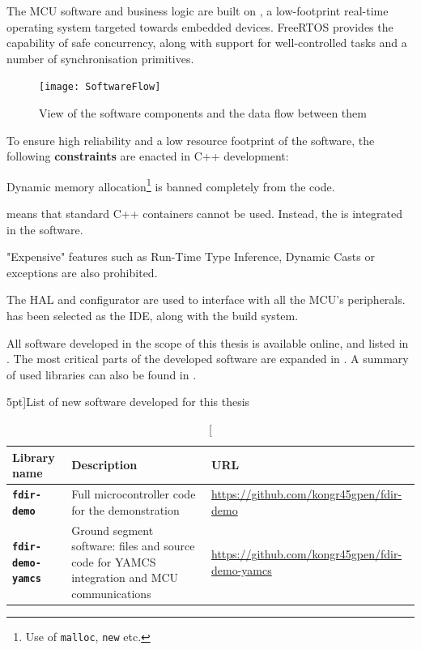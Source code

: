 \documentclass[a4paper,nobib]{tufte-book}
\begin{document}
The \ac{MCU} software and business logic are built on \textbf{}, a low-footprint real-time operating system targeted towards embedded devices. FreeRTOS provides the capability of safe concurrency, along with support for well-controlled tasks and a number of synchronisation primitives.

\begin{figure}[h]
	\texttt{[image: SoftwareFlow]}
	\caption{View of the software components and the data flow between them}
	\label{sec:softwareflow}
\end{figure}

To ensure high reliability and a low resource footprint of the software, the following \textbf{constraints} are enacted in C++ development:
\begin{compactenum}
	\item Dynamic memory allocation\footnote{Use of \texttt{malloc}, \texttt{new} etc.} is banned completely from the code.
	\label{itm:malloc}
	\item {} means that standard C++ containers cannot be used. Instead, the  is integrated in the software.
	\item "Expensive" features such as Run-Time Type Inference, Dynamic Casts or exceptions are also prohibited.
\end{compactenum}

The  \ac{HAL} and configurator are used to interface with all the \acs{MCU}'s peripherals.  has been selected as the \acs{IDE}, along with the  build system.

All software developed in the scope of this thesis is available online, and listed in . The most critical parts of the developed software are expanded in . A summary of used libraries can also be found in .

\begin{table}[h]
	\centering
	\caption[][5pt]{List of new software developed for this thesis}
	\label{tab:new_software}
	\begin{tabularx}{\textwidth}{@{}lXp{6cm}@{}}
		\toprule
		Library name & Description & URL \\ \midrule
		\textbf{\texttt{fdir-demo}} & Full microcontroller code for the demonstration & \small \url{https://github.com/kongr45gpen/fdir-demo} \\
		\textbf{\texttt{fdir-demo-yamcs}} & Ground segment software: files and source code for \acs{YAMCS} integration and \acs{MCU} communications & \small \url{https://github.com/kongr45gpen/fdir-demo-yamcs} \\
		\bottomrule
	\end{tabularx}
\end{table}
\end{document}
